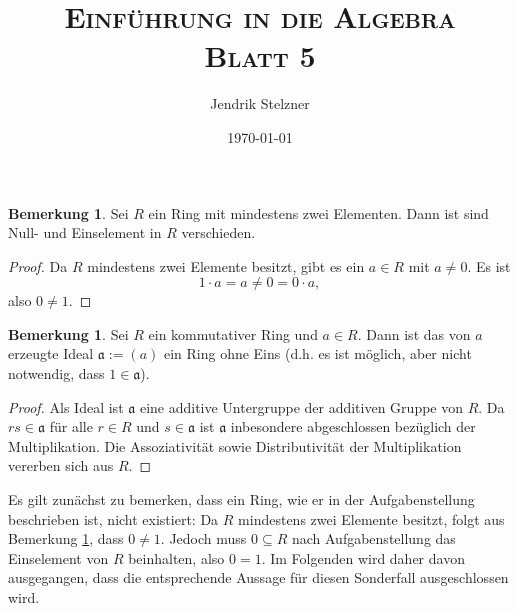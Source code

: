 \documentclass[a4paper,10pt]{article}
\title{\textsc{Einführung in die Algebra \\ \Large Blatt 5}}
\author{Jendrik Stelzner}
\date{\today}
\theoremstyle{definition}
\newtheorem{bem}[beh]{Bemerkung}
\newcommand{\mf}[1]{\mathfrak{#1}}
\begin{document}
\maketitle





\section{}





\section{}





\section{}

\begin{bem}\label{bem: 0 neq 1}
 Sei $R$ ein Ring mit mindestens zwei Elementen. Dann ist sind Null- und Einselement in $R$ verschieden.
\end{bem}
\begin{proof}
 Da $R$ mindestens zwei Elemente besitzt, gibt es ein $a \in R$ mit $a \neq 0$. Es ist
 \[
  1 \cdot a = a \neq 0 = 0 \cdot a,
 \]
 also $0 \neq 1$.
\end{proof}

\begin{bem}\label{bem: ideal ring ohne null}
 Sei $R$ ein kommutativer Ring und $a \in R$. Dann ist das von $a$ erzeugte Ideal $\mf{a} := (a)$ ein Ring ohne Eins (d.h. es ist möglich, aber nicht notwendig, dass $1 \in \mf{a}$).
\end{bem}
\begin{proof}
 Als Ideal ist $\mf{a}$ eine additive Untergruppe der additiven Gruppe von $R$. Da $rs \in \mf{a}$ für alle $r \in R$ und $s \in \mf{a}$ ist $\mf{a}$ inbesondere abgeschlossen bezüglich der Multiplikation. Die Assoziativität sowie Distributivität der Multiplikation vererben sich aus $R$.
\end{proof}

Es gilt zunächst zu bemerken, dass ein Ring, wie er in der Aufgabenstellung beschrieben ist, nicht existiert: Da $R$ mindestens zwei Elemente besitzt, folgt aus Bemerkung \ref{bem: 0 neq 1}, dass $0 \neq 1$. Jedoch muss $0 \subseteq R$ nach Aufgabenstellung das Einselement von $R$ beinhalten, also $0 = 1$. Im Folgenden wird daher davon ausgegangen, dass die entsprechende Aussage für diesen Sonderfall ausgeschlossen wird.
\end{document}
